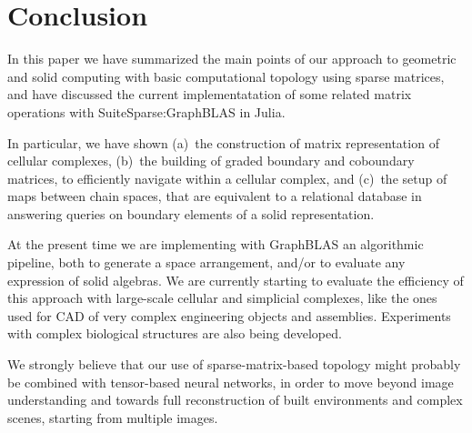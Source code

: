 \section{Conclusion}\label{conclusion}

In this paper we have summarized the main points of our approach to geometric and solid computing with basic computational topology using sparse matrices, and have discussed the current implementatation of some related  matrix operations with SuiteSparse:GraphBLAS in Julia.  

In particular, we have shown (a)~the construction of matrix  representation of cellular complexes, (b)~the building of graded boundary and coboundary matrices, to efficiently navigate within a cellular complex, and  (c)~the setup of maps between chain spaces, that are equivalent to a relational database in answering queries on boundary elements of a solid representation. 

At the present time we are implementing with GraphBLAS an algorithmic pipeline, both to  generate a space arrangement, and/or to evaluate any expression of solid algebras. We are currently starting to evaluate the efficiency of this approach with large-scale cellular and simplicial complexes, like the ones used for CAD of very complex engineering objects and assemblies. Experiments with complex biological structures are also being developed. 

We strongly believe that our use of sparse-matrix-based topology  might probably be combined with tensor-based neural networks, in order to move beyond image understanding and towards full reconstruction of built environments and complex scenes, starting from multiple images.
